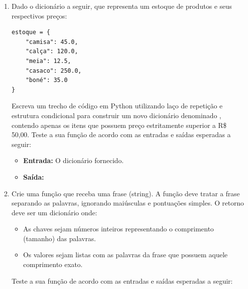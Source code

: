 \begin{enumerate}[label=\textbf{Q\arabic*.}]
\begin{itemize}
    \item \textbf{Entrada:} \\
    \item \textbf{Saída:} 
\end{itemize}





\item Dado o dicionário a seguir, que representa um estoque de produtos e seus respectivos preços:
\begin{verbatim}
estoque = {
    "camisa": 45.0,
    "calça": 120.0,
    "meia": 12.5,
    "casaco": 250.0,
    "boné": 35.0
}
\end{verbatim}
Escreva um trecho de código em Python utilizando laço de repetição e estrutura condicional para construir um novo dicionário denominado , contendo apenas os itens que possuem preço estritamente superior a R\$ 50,00. Teste a sua função de acordo com as entradas e saídas esperadas a seguir:

\begin{itemize}
    \item \textbf{Entrada:} O dicionário  fornecido.
    \item \textbf{Saída:} 
\end{itemize}



\item Crie uma função  que receba uma frase (string). A função deve tratar a frase separando as palavras, ignorando maiúsculas e pontuações simples. O retorno deve ser um dicionário onde:
\begin{itemize}
    \item As chaves sejam números inteiros representando o comprimento (tamanho) das palavras.
    \item Os valores sejam listas com as palavras da frase que possuem aquele comprimento exato.
\end{itemize}

Teste a sua função de acordo com as entradas e saídas esperadas a seguir:


\end{enumerate}
